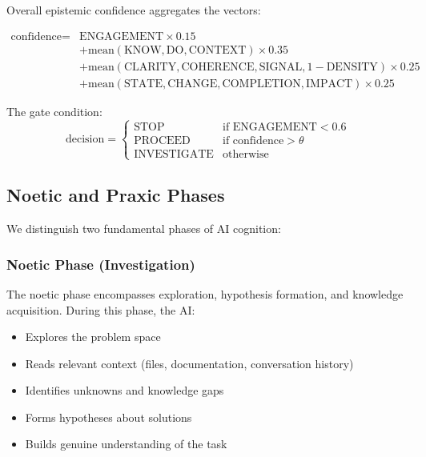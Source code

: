 Overall epistemic confidence aggregates the vectors:

\begin{equation}
\begin{aligned}
\text{confidence} = {} & \text{ENGAGEMENT} \times 0.15 \\
                      & + \text{mean}(\text{KNOW}, \text{DO}, \text{CONTEXT}) \times 0.35 \\
                      & + \text{mean}(\text{CLARITY}, \text{COHERENCE}, \text{SIGNAL}, 1-\text{DENSITY}) \times 0.25 \\
                      & + \text{mean}(\text{STATE}, \text{CHANGE}, \text{COMPLETION}, \text{IMPACT}) \times 0.25
\end{aligned}
\end{equation}

The gate condition:
\begin{equation}
\text{decision} =
\begin{cases}
\text{STOP} & \text{if ENGAGEMENT} < 0.6 \\
\text{PROCEED} & \text{if confidence} > \theta \\
\text{INVESTIGATE} & \text{otherwise}
\end{cases}
\end{equation}

\subsection{Noetic and Praxic Phases}

We distinguish two fundamental phases of AI cognition:

\subsubsection{Noetic Phase (Investigation)}

The noetic phase encompasses exploration, hypothesis formation, and knowledge acquisition. During this phase, the AI:

\begin{itemize}
    \item Explores the problem space
    \item Reads relevant context (files, documentation, conversation history)
    \item Identifies unknowns and knowledge gaps
    \item Forms hypotheses about solutions
    \item Builds genuine understanding of the task
\end{itemize}

